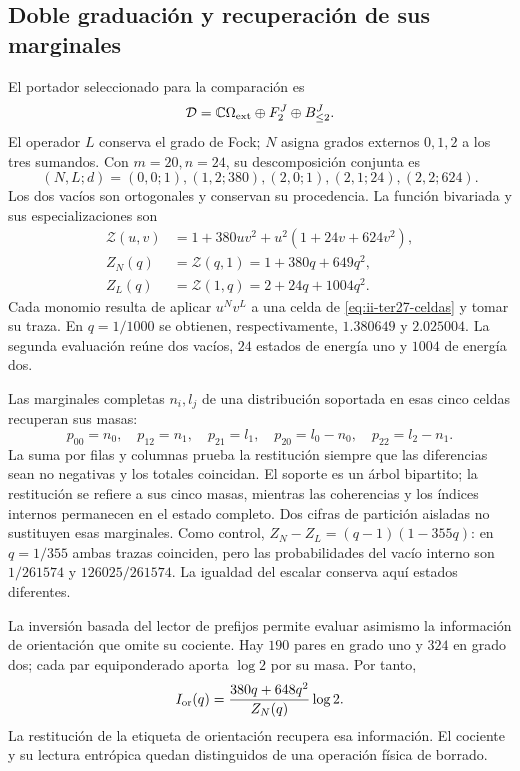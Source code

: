 \subsection{Doble graduación y recuperación de sus marginales}
\label{sec:ii-ter27-doble}

El portador seleccionado para la comparación es
\[
 \mathcal D=\mathbb C\Omega_{\rm ext}\oplus F_2^J\oplus B_{\leq2}^J.
\]
El operador $L$ conserva el grado de Fock; $N$ asigna grados externos
$0,1,2$ a los tres sumandos. Con $m=20,n=24$, su descomposición conjunta es
\begin{equation}
 (N,L;d)=(0,0;1),(1,2;380),(2,0;1),(2,1;24),(2,2;624).
 \label{eq:ii-ter27-celdas}
\end{equation}
Los dos vacíos son ortogonales y conservan su procedencia. La función
bivariada y sus especializaciones son
\begin{align}
 \mathcal Z(u,v)&=1+380uv^2+u^2(1+24v+624v^2),\\
 Z_N(q)&=\mathcal Z(q,1)=1+380q+649q^2,\\
 Z_L(q)&=\mathcal Z(1,q)=2+24q+1004q^2.
 \label{eq:ii-ter27-particiones}
\end{align}
Cada monomio resulta de aplicar $u^Nv^L$ a una celda de
\eqref{eq:ii-ter27-celdas} y tomar su traza. En $q=1/1000$ se obtienen,
respectivamente, $1.380649$ y $2.025004$. La segunda evaluación reúne dos
vacíos, $24$ estados de energía uno y $1004$ de energía dos.

Las marginales completas $n_i,l_j$ de una distribución soportada en
esas cinco celdas recuperan sus masas:
\[
 p_{00}=n_0,\quad p_{12}=n_1,\quad p_{21}=l_1,
 \quad p_{20}=l_0-n_0,\quad p_{22}=l_2-n_1.
\]
La suma por filas y columnas prueba la restitución siempre que las
diferencias sean no negativas y los totales coincidan. El soporte es un
árbol bipartito; la restitución se refiere a sus cinco masas, mientras
las coherencias y los índices internos permanecen en el estado completo.
Dos cifras de partición aisladas no sustituyen esas marginales. Como
control, $Z_N-Z_L=(q-1)(1-355q)$: en $q=1/355$ ambas trazas coinciden,
pero las probabilidades del vacío interno son $1/261574$ y
$126025/261574$. La igualdad del escalar conserva aquí estados diferentes.

La inversión basada del lector de prefijos permite evaluar asimismo la
información de orientación que omite su cociente. Hay $190$ pares en
grado uno y $324$ en grado dos; cada par equiponderado aporta $\log2$
por su masa. Por tanto,
\[
 I_{\rm or}(q)=\frac{380q+648q^2}{Z_N(q)}\log2.
\]
La restitución de la etiqueta de orientación recupera esa información.
El cociente y su lectura entrópica quedan distinguidos de una operación
física de borrado.

